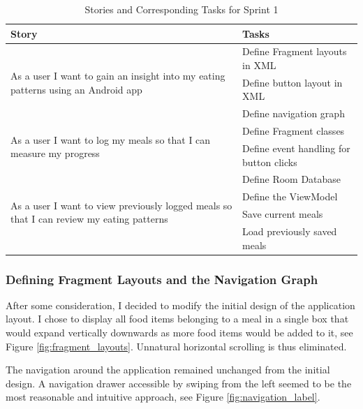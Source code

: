 \documentclass{article}
\begin{document}
\begin{table}[h]
\centering
\hspace*{-1.6cm}
\begin{tabular}{||m{8cm}|m{6cm}||}
\hline
    Story & Tasks \\ [0.5ex] 
    \hline
    \multirow{3}{\hsize}{As a user I want to gain an insight into my eating patterns using an Android app} & Define Fragment layouts in XML \\\cline{2-2} 
                                    & Define button layout in XML \\\cline{2-2} 
                                    & Define navigation graph  \\
    \hline
    \multirow{2}{\hsize}{As a user I want to log my meals so that I can measure my progress} & Define Fragment classes \\\cline{2-2} 
    & Define event handling for button clicks \\
    \hline
    \multirow{4}{\hsize}{As a user I want to view previously logged meals so that I can review my eating patterns} & Define Room Database \\\cline{2-2} 
    & Define the ViewModel \\\cline{2-2} 
    & Save current meals \\\cline{2-2} 
    & Load previously saved meals \\
    \hline
\end{tabular}
\caption{Stories and Corresponding Tasks for Sprint 1}
\label{table:stories_tasks_sprint_1}
\end{table}
\bigksip

\subsubsection{Defining Fragment Layouts and the Navigation Graph}
After some consideration, I decided to modify the initial design of the application layout. I chose to display all food items belonging to a meal in a single box that would expand vertically downwards as more food items would be added to it, see Figure \ref{fig:fragment_layouts}. Unnatural horizontal scrolling is thus eliminated.

\bigskip
\noindent The navigation around the application remained unchanged from the initial design. A navigation drawer accessible by swiping from the left seemed to be the most reasonable and intuitive approach, see Figure \ref{fig:navigation_label}.
\end{document}
